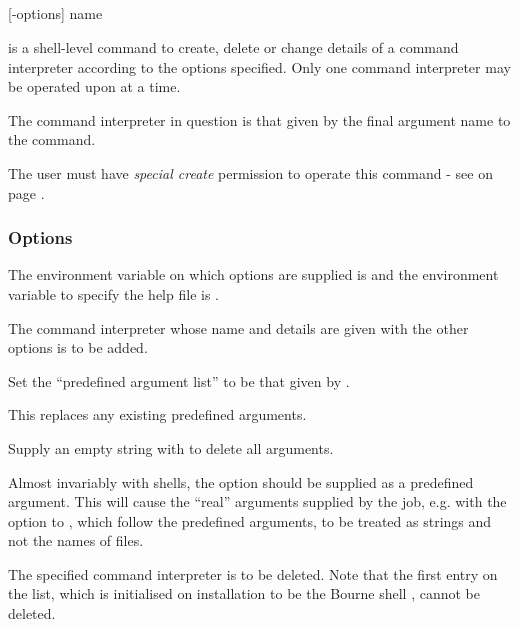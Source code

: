 \subsection{\BtcichangeName}

\begin{expara}

\BtcichangeName{} [-options] name

\end{expara}

\PrBtcichange{} is a shell-level command to create, delete or change details of a command interpreter according to the
options specified. Only one command interpreter may be operated upon at a time.

The command interpreter in question is that given by the final argument name to the command.

The user must have \textit{special create} permission to operate this command - see \PrBtuser{} on page \pageref{btuser:permsreq}.

\subsubsection{Options}
The environment variable on which options are supplied is \filename{\BtcichangeVarname} and the environment variable to specify
the help file is .

\explainopt


The command interpreter whose name and details are given with the other options is to be added.


Set the ``predefined argument list'' to be that given by .

This replaces any existing predefined arguments.

Supply an empty string with {\textquotedbl}{\textquotedbl} to delete all arguments.

Almost invariably with shells, the  option should be supplied as a predefined argument. This will cause the
``real'' arguments supplied by the job, e.g. with the  option to \PrBtr{}, which follow the predefined arguments, to
be treated as strings and not the names of files.


The specified command interpreter is to be deleted. Note that the first entry on the list, which is initialised on installation to be
the Bourne shell , cannot be deleted.

